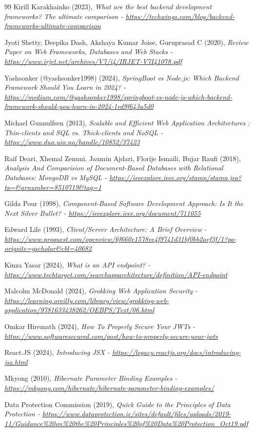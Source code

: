 \documentclass[]{final_report}
\begin{document}
\begin{thebibliography}{99}
 Kirill Karakhainko (2023),
\emph{What are the best backend development frameworks? The ultimate comparison - \url{https://techwings.com/blog/backend-frameworks-ultimate-comparison}}

 Jyoti Shetty, Deepika Dash, Akshaya Kumar Joise, Guruprasad C (2020),
\emph{Review Paper on Web Frameworks, Databases and Web Stacks - \url{https://www.irjet.net/archives/V7/i4/IRJET-V7I41078.pdf}}

 Yashsonker (@yashsonker1998) (2024),
\emph{SpringBoot vs Node.js: Which Backend Framework Should You Learn in 2024? - \url{https://medium.com/@yashsonker1998/springboot-vs-node-js-which-backend-framework-should-you-learn-in-2024-1ed9f643a5d0}}

 Michael Gunnulfsen (2013),
\emph{Scalable and Efficient Web Application Architectures : Thin-clients and SQL vs. Thick-clients and NoSQL - \url{https://www.duo.uio.no/handle/10852/37423}}

 Raif Deari, Xhemal Zenuni, Jaumin Ajdari, Florije Ismaili, Bujar Raufi (2018),
\emph{Analysis And Comparision of Document-Based Databases with Relational Databases: MongoDB vs MySQL - \url{https://ieeexplore.ieee.org/stamp/stamp.jsp?tp=&arnumber=8510719&tag=1}}



 Gilda Pour (1998),
\emph{Component-Based Software Development Approach: Is It the Next Silver Bullet? - \url{https://ieeexplore.ieee.org/document/711055}}


 Edward Lile (1993),
\emph{Client/Server Architecture: A Brief Overview - \url{https://www.proquest.com/openview/6f660e1578ee4f9741d31bf0bb2aef3f/1?pq-origsite=gscholar&cbl=40682}}


 Kinza Yasar (2024),
\emph{What is an API endpoint? - \url{https://www.techtarget.com/searchapparchitecture/definition/API-endpoint}}

 Malcolm McDonald (2024),
\emph{Grokking Web Application Security - \url{https://learning.oreilly.com/library/view/grokking-web-application/9781633438262/OEBPS/Text/06.html}}

 Omkar Hiremath (2024),
\emph{How To Properly Secure Your JWTs - \url{https://www.softwaresecured.com/post/how-to-properly-secure-your-jwts}}

 React.JS (2024),
\emph{Introducing JSX - \url{https://legacy.reactjs.org/docs/introducing-jsx.html}}

 Mkyong (2010),
\emph{Hibernate Parameter Binding Examples - \url{https://mkyong.com/hibernate/hibernate-parameter-binding-examples/}}

 Data Protection Commission (2019),
\emph{Quick Guide to the Principles of Data Protection - \url{https://www.dataprotection.ie/sites/default/files/uploads/2019-11/Guidance\%20on\%20the\%20Principles\%20of\%20Data\%20Protection_Oct19.pdf}}

\end{thebibliography}
\end{document}
